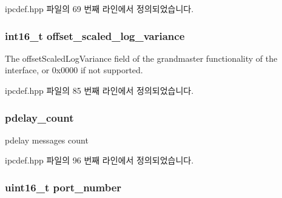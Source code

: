 ipcdef.\+hpp 파일의 69 번째 라인에서 정의되었습니다.

\subsubsection[{\texorpdfstring{offset\+\_\+scaled\+\_\+log\+\_\+variance}{offset_scaled_log_variance}}]{\setlength{\rightskip}{0pt plus 5cm}int16\+\_\+t offset\+\_\+scaled\+\_\+log\+\_\+variance}\hypertarget{structg_ptp_time_data_a022841cfc4d83dc906f116eec53f1d9a}{}\label{structg_ptp_time_data_a022841cfc4d83dc906f116eec53f1d9a}


The offset\+Scaled\+Log\+Variance field of the grandmaster functionality of the interface, or 0x0000 if not supported. 



ipcdef.\+hpp 파일의 85 번째 라인에서 정의되었습니다.

\subsubsection[{\texorpdfstring{pdelay\+\_\+count}{pdelay_count}}]{ pdelay\+\_\+count}\hypertarget{structg_ptp_time_data_a7557e8c3c5a258ba096b5c1c274f17bf}{}\label{structg_ptp_time_data_a7557e8c3c5a258ba096b5c1c274f17bf}


pdelay messages count 



ipcdef.\+hpp 파일의 96 번째 라인에서 정의되었습니다.

\subsubsection[{\texorpdfstring{port\+\_\+number}{port_number}}]{\setlength{\rightskip}{0pt plus 5cm}uint16\+\_\+t port\+\_\+number}\hypertarget{structg_ptp_time_data_af0afa7bb85d49ac5ff873fad86a48ec5}{}\label{structg_ptp_time_data_af0afa7bb85d49ac5ff873fad86a48ec5}


